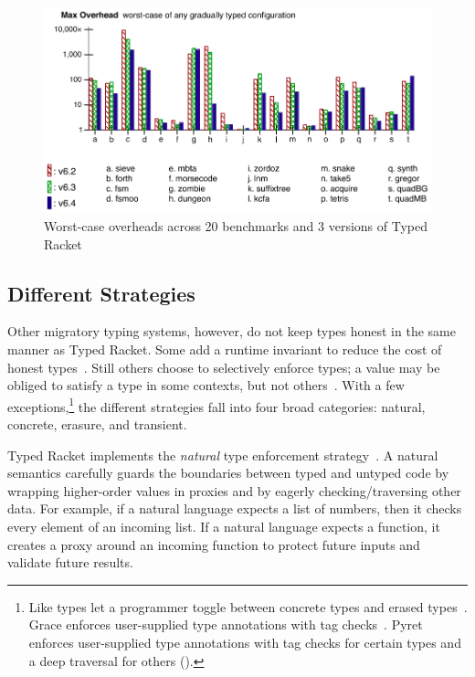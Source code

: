 \begin{figure}[h]
  \includegraphics[width=0.8\columnwidth]{src/jfp-2019-max.png}
  \caption{Worst-case overheads across 20 benchmarks and 3 versions of Typed Racket~\cite{gtnffvf-jfp-2019}}
  \label{fig:max-overhead}
\end{figure}


\subsection{Different Strategies}

Other migratory typing systems, however, do not keep types honest in the
 same manner as Typed Racket.
Some add a runtime invariant to reduce the cost of honest types~\cite{wnlov-popl-2010,bmt-ecoop-2010,mt-oopsla-2017}.
Still others choose to selectively enforce types; a value may be obliged to
 satisfy a type in some contexts, but not others~\cite{vss-popl-2017}.
With a few exceptions,\footnote{Like types
 let a programmer toggle between concrete types and erased types~\cite{wnlow-popl-2010,rzv-ecoop-2015}.
 Grace enforces user-supplied type annotations with tag checks~\cite{rmhn-ecoop-2019}.
 Pyret enforces user-supplied type annotations with tag checks
  for certain types and a deep traversal for others ().}
 the different strategies fall into four broad categories:
 natural, concrete, erasure, and transient.

Typed Racket implements the \emph{natural}\/ type enforcement
 strategy~\cite{mf-toplas-2009,tf-popl-2008}.
A natural semantics carefully guards the boundaries between typed and untyped
 code by wrapping higher-order values in proxies and by eagerly
 checking/traversing other data.
For example, if a natural language expects a list of numbers, then it
 checks every element of an incoming list.
If a natural language expects a function, it creates a proxy around an incoming
 function to protect future inputs and validate future results.

